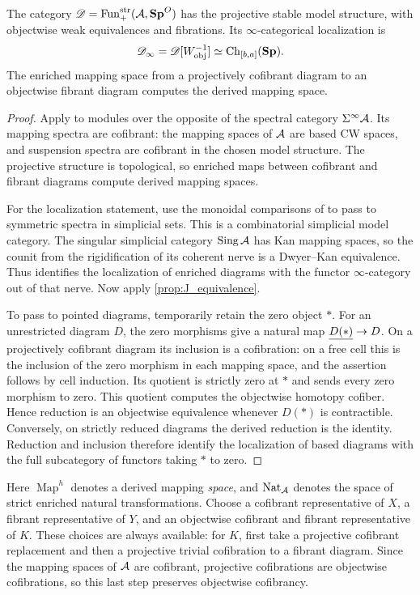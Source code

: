 \begin{prop}\label{prop:ChModels.derived}
    The category $\mathscr D=\operatorname{Fun}_+^{\mathrm{str}}(\mathcal{A},\mathbf{Sp}^O)$ has the projective stable model structure, with objectwise weak equivalences and fibrations. Its $\infty$-categorical localization is
    \[
        \mathscr D_\infty
        =\mathscr D[W_{\mathrm{obj}}^{-1}]
        \simeq\operatorname{Ch}_{[b,a]}(\mathbf{Sp}).
    \]
    The enriched mapping space from a projectively cofibrant diagram to an objectwise fibrant diagram computes the derived mapping space.
\end{prop}
\begin{proof}
    Apply \cite[Theorem~7.2(1)]{SS03monoidal} to modules over the opposite of the spectral category $\Sigma^\infty\mathcal{A}$. Its mapping spectra are cofibrant: the mapping spaces of $\mathcal{A}$ are based CW spaces, and suspension spectra are cofibrant in the chosen model structure. The projective structure is topological, so enriched maps between cofibrant and fibrant diagrams compute derived mapping spaces.

    For the localization statement, use the monoidal comparisons of \cite[Sections~6--7]{SS03monoidal} to pass to symmetric spectra in simplicial sets. This is a combinatorial simplicial model category. The singular simplicial category $\operatorname{Sing}\mathcal{A}$ has Kan mapping spaces, so the counit from the rigidification of its coherent nerve is a Dwyer--Kan equivalence. Thus \cite[Proposition~4.2.4.4]{Lur09} identifies the localization of enriched diagrams with the functor $\infty$-category out of that nerve. Now apply \cref{prop:J_equivalence}.

    To pass to pointed diagrams, temporarily retain the zero object $*$. For an unrestricted diagram $D$, the zero morphisms give a natural map $\underline{D(*)}\to D$. On a projectively cofibrant diagram its inclusion is a cofibration: on a free cell this is the inclusion of the zero morphism in each mapping space, and the assertion follows by cell induction. Its quotient is strictly zero at $*$ and sends every zero morphism to zero. This quotient computes the objectwise homotopy cofiber. Hence reduction is an objectwise equivalence whenever $D(*)$ is contractible. Conversely, on strictly reduced diagrams the derived reduction is the identity. Reduction and inclusion therefore identify the localization of based diagrams with the full subcategory of functors taking $*$ to zero.
\end{proof}

Here $\operatorname{Map}^h$ denotes a derived mapping \emph{space}, and $\operatorname{Nat}_{\mathcal{A}}$ denotes the space of strict enriched natural transformations. Choose a cofibrant representative of $X$, a fibrant representative of $Y$, and an objectwise cofibrant and fibrant representative of $K$. These choices are always available: for $K$, first take a projective cofibrant replacement and then a projective trivial cofibration to a fibrant diagram. Since the mapping spaces of $\mathcal{A}$ are cofibrant, projective cofibrations are objectwise cofibrations, so this last step preserves objectwise cofibrancy.

